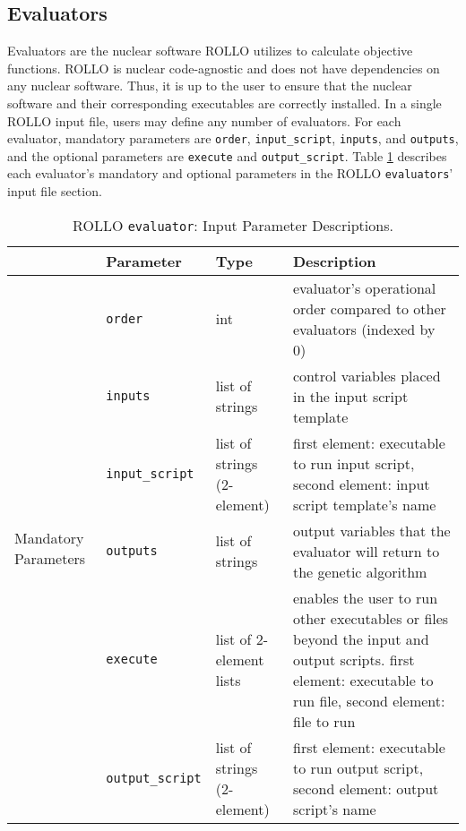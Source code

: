 \subsection{Evaluators}
Evaluators are the nuclear software \gls{ROLLO} utilizes to calculate objective functions. 
\gls{ROLLO} is nuclear code-agnostic and does not have dependencies on any 
nuclear software.
Thus, it is up to the user to ensure that the nuclear software and their corresponding 
executables are correctly installed. 
In a single \gls{ROLLO} input file, users may define any number of evaluators. 
For each evaluator, mandatory parameters are \texttt{order}, \texttt{input\_script}, 
\texttt{inputs}, and \texttt{outputs}, and the optional parameters are
\texttt{execute} and \texttt{output\_script}. 
Table \ref{tab:evaluator-inputs} describes each evaluator's mandatory and optional parameters 
in the \gls{ROLLO} \texttt{evaluators}' input file section.  
\begin{table}[htbp]
    \centering
    \onehalfspacing
    \caption{\acrfull{ROLLO} \texttt{evaluator}: Input Parameter Descriptions.}
	\label{tab:evaluator-inputs}
    \footnotesize
    \begin{tabular}{l|lp{2.5cm}p{7cm}}
    \hline
    & \textbf{Parameter} & \textbf{Type} & \textbf{Description} \\
    \hline
    \multirow{9}{2cm}{Mandatory Parameters} & \texttt{order} & int 
    & evaluator's operational order compared to other evaluators (indexed by 0) \\
    \cline{2-4}
    & \texttt{inputs} & list of strings & control variables placed in the input script template \\
    \cline{2-4}
    & \texttt{input\_script} & list of strings (2-element) & first element: executable to run input script, 
    second element: input script template's name \\
    \cline{2-4}
    & \texttt{outputs} & list of strings & output variables that the evaluator will return to the genetic algorithm \\
    \hline
    \multirow{4}{2cm}{Optional Parameters} & \texttt{execute} & list of 2-element lists &
    enables the user to run other executables or files beyond the input and output scripts. first element: executable to run file, 
    second element: file to run \\
    \cline{2-4}
    & \texttt{output\_script} & list of strings (2-element) & first element: executable to run output script, 
    second element: output script's name \\
    \hline 
    \end{tabular}
    \end{table}

